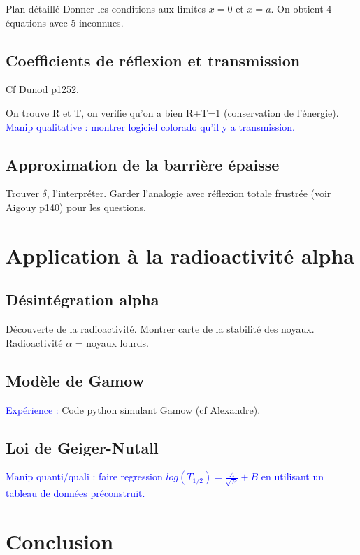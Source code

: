\begin{reportBlock}{Plan détaillé}
Donner les conditions aux limites $x=0$ et $x=a$. On obtient 4 équations avec 5 inconnues.

\subsection{Coefficients de réflexion et transmission}
Cf Dunod p1252.


On trouve R et T, on verifie qu'on a bien R+T=1 (conservation de l'énergie). \\

\textcolor{blue}{Manip qualitative : montrer logiciel colorado qu'il y a transmission.}

\subsection{Approximation de la barrière épaisse}
Trouver $\delta$, l'interpréter. Garder l'analogie avec réflexion totale frustrée (voir Aigouy p140) pour les questions.

\section{Application à la radioactivité alpha}

\subsection{Désintégration alpha}
Découverte de la radioactivité. Montrer carte de la stabilité des noyaux. Radioactivité $\alpha$ = noyaux lourds.
\subsection{Modèle de Gamow}
\textcolor{blue}{Expérience :} Code python simulant Gamow (cf Alexandre).

\subsection{Loi de Geiger-Nutall}
\textcolor{blue}{Manip quanti/quali : faire regression $log(T_{1/2}) = \frac{A}{\sqrt{E}}+B$ en utilisant un tableau de données préconstruit.}

\section*{Conclusion}


\end{reportBlock}